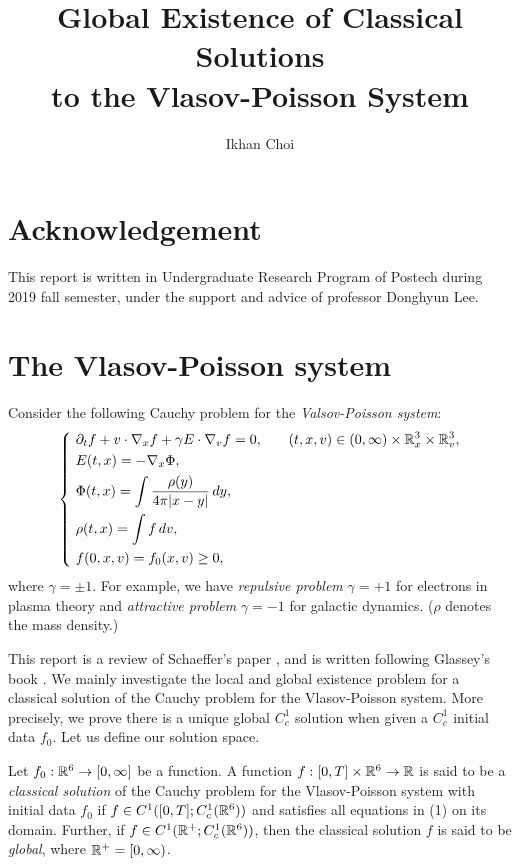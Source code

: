 \documentclass{article}
\title{Global Existence of Classical Solutions\\to the Vlasov-Poisson System}
\author{Ikhan Choi}
\date{
}
\begin{document}
\maketitle
\tableofcontents

\section*{Acknowledgement}
This report is written in Undergraduate Research Program of Postech during 2019 fall semester, under the support and advice of professor Donghyun Lee.


\clearpage
\section{The Vlasov-Poisson system}
Consider the following Cauchy problem for the \emph{Valsov-Poisson system}:
\begin{align}
\left\{\ \begin{alignedat}{2}
&\pd_tf+v\cdot\nabla_xf+\gamma E\cdot\nabla_vf=0,&&\qquad(t,x,v)\in(0,\infty)\times\R_x^3\times\R_v^3,\\
&E(t,x)=-\nabla_x\Phi,\\
&\Phi(t,x)=\int\frac{\rho(y)}{4\pi|x-y|}\,dy,\\
&\rho(t,x)=\int f\,dv,\\
&f(0,x,v)=f_0(x,v)\ge0,
\end{alignedat}\right.
\end{align}
where $\gamma=\pm1$.
For example, we have \emph{repulsive problem} $\gamma=+1$ for electrons in plasma theory and \emph{attractive problem} $\gamma=-1$ for galactic dynamics.
($\rho$ denotes the mass density.)

This report is a review of Schaeffer's paper \cite{schaeffer1991global}, and is written following Glassey's book \cite{glassey1996cauchy}.
We mainly investigate the local and global existence problem for a classical solution of the Cauchy problem for the Vlasov-Poisson system.
More precisely, we prove there is a unique global $C_c^1$ solution when given a $C_c^1$ initial data $f_0$.
Let us define our solution space.

\begin{defn*}
Let $f_0:\mathbb{R}^6\to[0,\infty]$ be a function.
A function $f:[0,T]\times\mathbb{R}^6\to\mathbb{R}$ is said to be a \emph{classical solution} of the Cauchy problem for the Vlasov-Poisson system with initial data $f_0$ if $f\in C^1([0,T];C_c^1(\mathbb{R}^6))$ and satisfies all equations in (1) on its domain.
Further, if $f\in C^1(\mathbb{R}^+;C_c^1(\mathbb{R}^6))$, then the classical solution $f$ is said to be \emph{global}, where $\mathbb{R}^+=[0,\infty)$.
\end{defn*}
\end{document}
